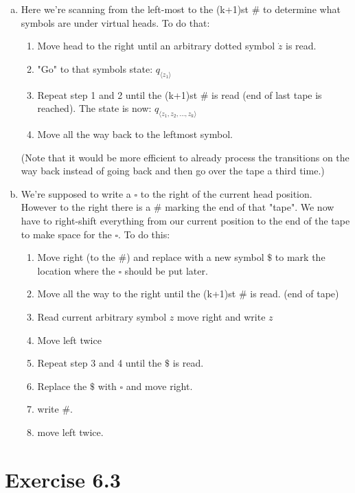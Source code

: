 \documentclass{article} %
\newcommand{\homeworkNumber}{6}
\begin{document}
\begin{enumerate}[(a)]
\item
Here we're scanning from the left-most to the (k+1)st $\#$ to determine what symbols are under virtual heads. To do that:
\begin{enumerate}[1.]
\item Move head to the right until an arbitrary dotted symbol $\dot{z}$ is read.
\item "Go" to that symbols state: $q_{\langle z_1 \rangle}$
\item Repeat step 1 and 2 until the (k+1)st $\#$ is read (end of last tape is reached). The state is now: $q_{\langle z_1, z_2, \dots, z_k \rangle}$
\item Move all the way back to the leftmost symbol.
\end{enumerate}
(Note that it would be more efficient to already process the transitions on the way back instead of going back and then go over the tape a third time.)
\clearpage
\item
We're supposed to write a $\square$ to the right of the current head position. However to the right there is a $\#$ marking the end of that "tape". We now have to right-shift everything from our current position to the end of the tape to make space for the $\square$. To do this:
\begin{enumerate}[1.]
\item Move right (to the $\#$) and replace with a new symbol $\$$ to mark the location where the $\square$ should be put later.
\item Move all the way to the right until the (k+1)st $\#$ is read. (end of tape)
\item Read current arbitrary symbol $z$ move right and write $z$
\item Move left twice
\item Repeat step 3 and 4 until the $\$$ is read.
\item Replace the $\$$ with $\square$ and move right.
\item write $\#$.
\item move left twice.
\end{enumerate}

\end{enumerate}

\clearpage




\section*{Exercise \homeworkNumber.3}
\end{document}
